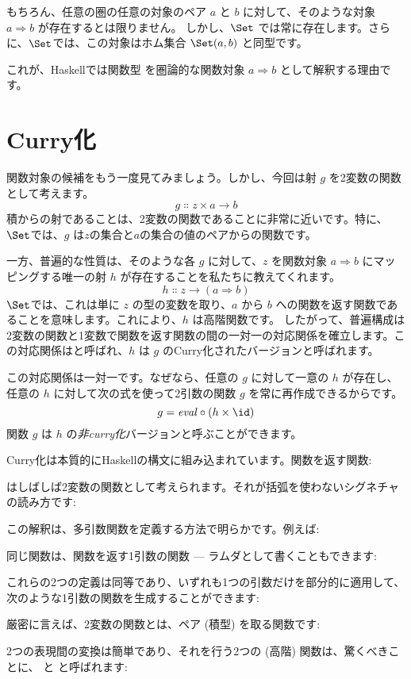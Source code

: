 \noindent
もちろん、任意の圏の任意の対象のペア $a$ と $b$ に対して、そのような対象 $a \Rightarrow b$ が存在するとは限りません。
しかし、$\Set$ では常に存在します。さらに、$\Set$では、この対象はホム集合 $\Set(a, b)$ と同型です。

これが、Haskellでは関数型  を圏論的な関数対象 $a \Rightarrow b$ として解釈する理由です。

\section{Curry化}

関数対象の候補をもう一度見てみましょう。しかし、今回は射 $g$ を2変数の関数として考えます。
\[g \Colon z \times a \to b\]
積からの射であることは、2変数の関数であることに非常に近いです。特に、$\Set$では、$g$ は$z$の集合と$a$の集合の値のペアからの関数です。

一方、普遍的な性質は、そのような各 $g$ に対して、$z$ を関数対象 $a \Rightarrow b$ にマッピングする唯一の射 $h$ が存在することを私たちに教えてくれます。
\[h \Colon z \to (a \Rightarrow b)\]
$\Set$では、これは単に $z$ の型の変数を取り、$a$ から $b$ への関数を返す関数であることを意味します。これにより、$h$ は高階関数です。
したがって、普遍構成は2変数の関数と1変数で関数を返す関数の間の一対一の対応関係を確立します。この対応関係はと呼ばれ、$h$ は $g$ のCurry化されたバージョンと呼ばれます。

この対応関係は一対一です。なぜなら、任意の $g$ に対して一意の $h$ が存在し、任意の $h$ に対して次の式を使って2引数の関数 $g$ を常に再作成できるからです。
\[g = \mathit{eval} \circ (h \times \id)\]
関数 $g$ は $h$ の\emph{非curry化}バージョンと呼ぶことができます。

Curry化は本質的にHaskellの構文に組み込まれています。関数を返す関数: 

はしばしば2変数の関数として考えられます。それが括弧を使わないシグネチャの読み方です: 

この解釈は、多引数関数を定義する方法で明らかです。例えば: 

同じ関数は、関数を返す1引数の関数 --- ラムダとして書くこともできます: 

これらの2つの定義は同等であり、いずれも1つの引数だけを部分的に適用して、次のような1引数の関数を生成することができます: 

厳密に言えば、2変数の関数とは、ペア (積型) を取る関数です: 

2つの表現間の変換は簡単であり、それを行う2つの (高階) 関数は、驚くべきことに、 と  と呼ばれます: 

